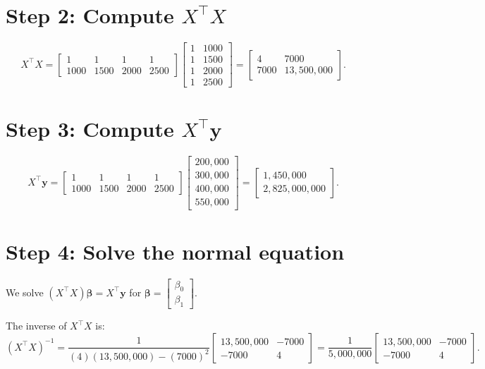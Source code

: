 \documentclass{article}
\begin{document}
\section*{Step 2: Compute $X^\top X$}

\[
X^\top X =
\begin{bmatrix}
1 & 1 & 1 & 1 \\
1000 & 1500 & 2000 & 2500
\end{bmatrix}
\begin{bmatrix}
1 & 1000 \\
1 & 1500 \\
1 & 2000 \\
1 & 2500
\end{bmatrix}
=
\begin{bmatrix}
4 & 7000 \\
7000 & 13{,}500{,}000
\end{bmatrix}.
\]

\section*{Step 3: Compute $X^\top \mathbf{y}$}

\[
X^\top \mathbf{y} =
\begin{bmatrix}
1 & 1 & 1 & 1 \\
1000 & 1500 & 2000 & 2500
\end{bmatrix}
\begin{bmatrix}
200{,}000 \\
300{,}000 \\
400{,}000 \\
550{,}000
\end{bmatrix}
=
\begin{bmatrix}
1{,}450{,}000 \\
2{,}825{,}000{,}000
\end{bmatrix}.
\]

\section*{Step 4: Solve the normal equation}

We solve $(X^\top X)\boldsymbol{\beta} = X^\top \mathbf{y}$ for $\boldsymbol{\beta} = \begin{bmatrix} \beta_0 \\ \beta_1 \end{bmatrix}$.

The inverse of $X^\top X$ is:
\[
(X^\top X)^{-1} = \frac{1}{(4)(13{,}500{,}000) - (7000)^2}
\begin{bmatrix}
13{,}500{,}000 & -7000 \\
-7000 & 4
\end{bmatrix}
= \frac{1}{5{,}000{,}000}
\begin{bmatrix}
13{,}500{,}000 & -7000 \\
-7000 & 4
\end{bmatrix}.
\]
\end{document}
